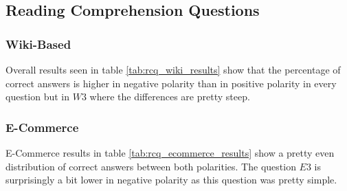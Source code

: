 \subsection{Reading Comprehension Questions}
\subsubsection{Wiki-Based}
Overall results seen in table \ref{tab:rcq_wiki_results} show that the percentage of correct answers 
is higher in negative polarity than in positive polarity in every question but in $W3$ where
the differences are pretty steep.
\begin{table}[H]
    \centering
    \small
    \setlength{\tabcolsep}{4pt}
    \renewcommand{\arraystretch}{1.3}
    \caption{Basic data per question of the Wiki-Based Scene}
    \label{tab:rcq_wiki_results}

\end{table}
\subsubsection{E-Commerce}
E-Commerce results in table \ref{tab:rcq_ecommerce_results} show a pretty even distribution of 
correct answers between both polarities. The question $E3$ is surprisingly a bit lower in 
negative polarity as this question was pretty simple.
\begin{table}[H]
    \centering
    \small
    \setlength{\tabcolsep}{4pt}
    \renewcommand{\arraystretch}{1.3}
    \caption{Basic data per question of the E-Commerce Scene}
    \label{tab:rcq_ecommerce_results}

\end{table}
